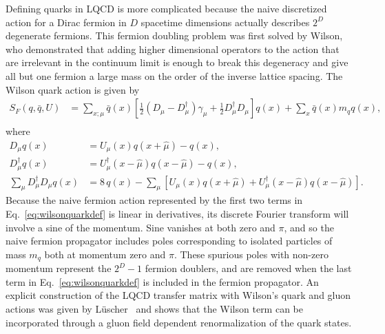 Defining quarks in LQCD is more complicated because the naive discretized action for a Dirac fermion in $D$ spacetime dimensions actually describes $2^D$ degenerate fermions.
This fermion doubling problem was first solved by Wilson, who demonstrated that adding higher dimensional operators to the action that are irrelevant in the continuum limit is enough to break this degeneracy and give all but one fermion a large mass on the order of the inverse lattice spacing.
The Wilson quark action is given by
\begin{equation}
  \begin{split}
    S_F(q,\bar{q},U) &= \sum_{x;\mu} \bar{q}(x)\left[\frac{1}{2}(D_\mu -D_\mu^\dagger)\gamma_\mu + \frac{1}{2} D_\mu^\dagger D_\mu\right]q(x) + \sum_x \bar{q}(x)m_q q(x), \\
\end{split}
\label{eq:wilsonquarkdef}
\end{equation}
where
\begin{equation}
  \begin{split}
    D_\mu q(x) &= U_\mu(x)q(x+\hat{\mu}) - q(x),\\
    D_\mu^\dagger q(x) &= U_\mu^\dagger(x-\hat{\mu})q(x-\hat{\mu}) - q(x),\\
    \sum_\mu D_\mu^\dagger D_\mu q(x) &= 8\,q(x) - \sum_\mu\left[ U_\mu(x)q(x+\hat{\mu}) + U_\mu^\dagger(x-\hat{\mu})q(x-\hat{\mu}) \right].
\end{split}
\label{eq:quarkgaugecovariant}
\end{equation}
Because the naive fermion action represented by the first two terms in  Eq.~\eqref{eq:wilsonquarkdef} is linear in derivatives, its discrete Fourier transform will involve a sine of the momentum.
Sine vanishes at both zero and $\pi$, and so the naive fermion propagator includes poles corresponding to isolated particles of mass $m_q$ both at momentum zero and $\pi$.
These spurious poles with non-zero momentum represent the $2^D-1$ fermion doublers, and are removed when the last term in Eq.~\eqref{eq:wilsonquarkdef} is included in the fermion propagator.
An explicit construction of the LQCD transfer matrix with Wilson's quark and gluon actions was given by L{\"u}scher~\cite{Luscher:1977} and shows that the Wilson term can be incorporated through a gluon field dependent renormalization of the quark states.

